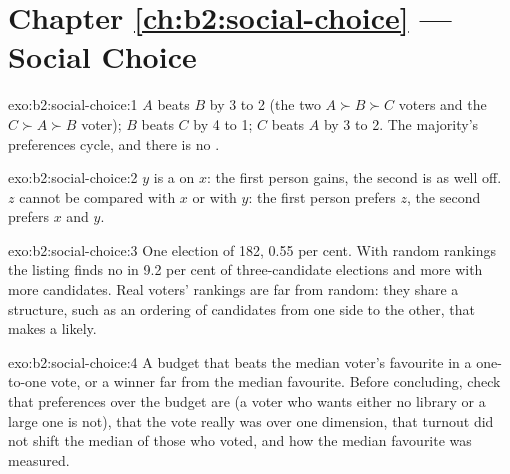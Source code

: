 \section*{Chapter \ref{ch:b2:social-choice} --- Social Choice}

\begin{solution}{exo:b2:social-choice:1}
$A$ beats $B$ by 3 to 2 (the two $A \succ B \succ C$ voters and the $C \succ A \succ B$ voter); $B$ beats $C$ by 4 to 1; $C$
beats $A$ by 3 to 2. The majority's preferences cycle, and there is no .
\end{solution}

\begin{solution}{exo:b2:social-choice:2}
$y$ is a  on $x$: the first person gains, the second is as well off. $z$ cannot be compared
with $x$ or with $y$: the first person prefers $z$, the second prefers $x$ and $y$.
\end{solution}

\begin{solution}{exo:b2:social-choice:3}
One election of 182, 0.55 per cent. With random rankings the listing finds no  in 9.2 per cent of
three-candidate elections and more with more candidates. Real voters' rankings are far from random: they
share a structure, such as an ordering of candidates from one side to the other, that makes a  likely.
\end{solution}

\begin{solution}{exo:b2:social-choice:4}
A budget that beats the median voter's favourite in a one-to-one vote, or a winner far from the median
favourite. Before concluding, check that preferences over the budget are  (a voter who wants
either no library or a large one is not), that the vote really was over one dimension, that turnout did not
shift the median of those who voted, and how the median favourite was measured.
\end{solution}


